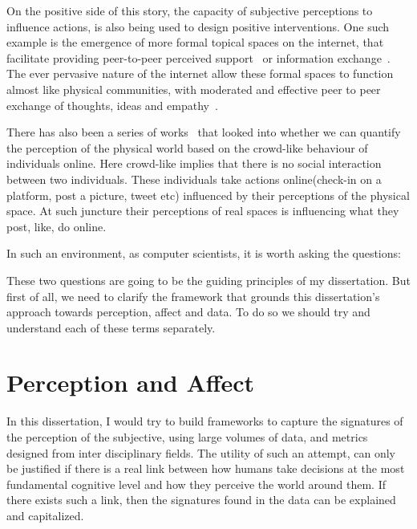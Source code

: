 On the positive side of this story, the capacity of subjective perceptions to influence actions, is also being used to design positive interventions. One such example is the emergence of more formal topical spaces on the internet, that facilitate providing peer-to-peer perceived support~\cite{coulson2005receiving,balasooriya2016barriers} or information exchange~\cite{frost2008social}. The ever pervasive nature of the internet allow these formal spaces to function almost like physical communities, with moderated and effective peer to peer exchange of thoughts, ideas and empathy~\cite{kummervold2002social,squire2015should,hwang2010social}.

There has also been a series of works~\cite{jang2019crowd,quercia2014aesthetic,quercia2015smelly,quercia2015chatty,quercia2014shortest} that looked into whether we can quantify the perception of the physical world based on the crowd-like behaviour of individuals online. Here crowd-like implies that there is no social interaction between two individuals. These individuals take actions online(check-in on a platform, post a picture, tweet etc) influenced by their perceptions of the physical space. At such juncture their perceptions of real spaces is influencing what they post, like, do online.

In such an environment, as computer scientists, it is worth asking the questions:

\noindent{}

\vspace{1cm}
These two questions are going to be the guiding principles of my dissertation. But first of all, we need to clarify the framework that grounds this dissertation's approach towards perception, affect and data. To do so we should try and understand each of these terms separately. 

\section{Perception and Affect}
In this dissertation, I would try to build frameworks to capture the signatures of the perception of the subjective, using large volumes of data, and metrics designed from inter disciplinary fields. The utility of such an attempt, can only be justified if there is a real link between how humans take decisions at the most fundamental cognitive level and how they perceive the world around them. If there exists such a link, then the signatures found in the data can be explained and capitalized. 

